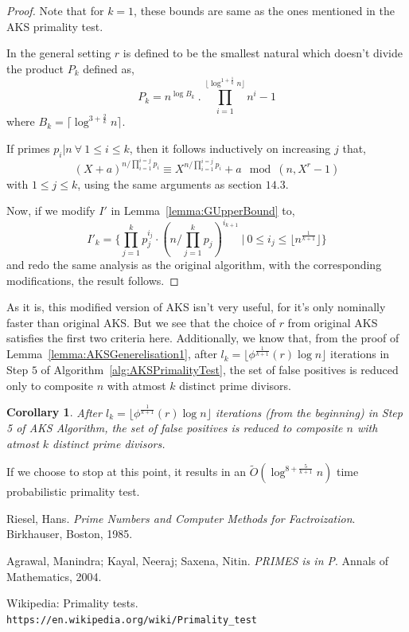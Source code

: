 \documentclass[11pt]{article}
\newtheorem{corollary}{Corollary}[theorem]
\begin{document}
\begin{proof}
Note that for $k=1$, these bounds are same as the ones mentioned in the AKS primality test. 

In the general setting $r$ is defined to be the smallest natural which doesn't divide the product $P_k$ defined as,
\[P_k = n^{\log B_k}\ .\ \prod_{i=1}^{\lfloor \log^{1 + \frac{1}{k}} n \rfloor}{n^i-1} \]
where $B_k = \lceil \log^{3 + \frac{2}{k}} n \rceil$.

If primes $p_i | n\ \forall \ 1 \leq i \leq k$, then it follows inductively on increasing $j$ that,
\[(X+a)^{n/\prod_{i=1}^{i=j} p_i} \equiv X^{n/\prod_{i=1}^{i=j} p_i} + a \mod (n, X^r - 1)\]
with $1 \leq j \leq k$, using the same arguments as section $14.3$. 

Now, if we modify $I'$ in Lemma~\ref{lemma:GUpperBound} to,
\[I'_k = \{ \prod_{j=1}^{k}p_j^{i_j} \cdot (n/\prod_{j=1}^{k}p_j)^{i_{k+1}} \ \vert \ 0 \leq i_j \leq \lfloor n^\frac{1}{k+1} \rfloor \}\]
and redo the same analysis as the original algorithm, with the corresponding modifications, the result follows.
\end{proof}

As it is, this modified version of AKS isn't very useful, for it's only nominally faster than original AKS. But we see that the choice of $r$ from original AKS satisfies the first two criteria here. Additionally, we know that, from the proof of Lemma~\ref{lemma:AKSGenerelisation1}, after $l_k = \lfloor \phi^\frac{1}{k+1}(r) \log n \rfloor$ iterations in Step $5$ of Algorithm~\ref{alg:AKSPrimalityTest}, the set of false positives is reduced only to composite $n$ with atmost $k$ distinct prime divisors.

\begin{corollary} After $l_k = \lfloor \phi^\frac{1}{k+1}(r) \log n \rfloor$ iterations (from the beginning) in Step 5 of AKS Algorithm, the set of false positives is reduced to composite $n$ with atmost $k$ distinct prime divisors.
\end{corollary}

If we choose to stop at this point, it results in an $\tilde O(\log^{8 + \frac{5}{k+1}} n)$ time probabilistic primality test.

\begin{thebibliography}{9}
Riesel, Hans. 
\textit{Prime Numbers and Computer Methods for Factroization}. Birkhauser, Boston, 1985.
 
Agrawal, Manindra; Kayal, Neeraj; Saxena, Nitin. \textit{PRIMES is in P}. Annals of Mathematics, 2004.

 
Wikipedia: Primality tests.
\\\texttt{https://en.wikipedia.org/wiki/Primality\_test}
\end{thebibliography}
\end{document}
